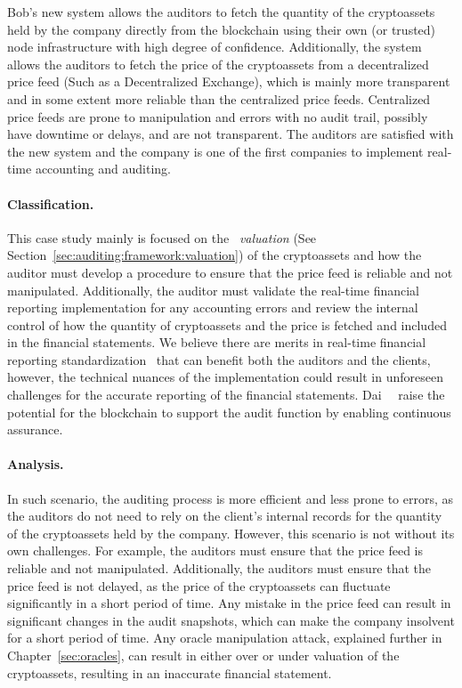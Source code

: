 Bob's new system allows the auditors to fetch the quantity of the cryptoassets held by the company directly from the blockchain using their own (or trusted) node infrastructure with high degree of confidence. Additionally, the system allows the auditors to fetch the price of the cryptoassets from a decentralized price feed (Such as a Decentralized Exchange), which is mainly more transparent and in some extent more reliable than the centralized price feeds. Centralized price feeds are prone to manipulation and errors with no audit trail, possibly have downtime or delays, and are not transparent. The auditors are satisfied with the new system and the company is one of the first companies to implement real-time accounting and auditing. 

\paragraph{Classification.} This case study mainly is focused on the ~\textit{valuation} (See Section~\ref{sec:auditing:framework:valuation}) of the cryptoassets and how the auditor must develop a procedure to ensure that the price feed is reliable and not manipulated. Additionally, the auditor must validate the real-time financial reporting implementation for any accounting errors and review the internal control of how the quantity of cryptoassets and the price is fetched and included in the financial statements. We believe there are merits in real-time financial reporting standardization~\cite{bakarich2020use,yu2018blockchain} that can benefit both the auditors and the clients, however, the technical nuances of the implementation could result in unforeseen challenges for the accurate reporting of the financial statements. Dai~\etal~\cite{dai2017toward} raise the potential for the blockchain to support the audit function by enabling continuous assurance. 


\paragraph{Analysis.} In such scenario, the auditing process is more efficient and less prone to errors, as the auditors do not need to rely on the client's internal records for the quantity of the cryptoassets held by the company. However, this scenario is not without its own challenges. For example, the auditors must ensure that the price feed is reliable and not manipulated. Additionally, the auditors must ensure that the price feed is not delayed, as the price of the cryptoassets can fluctuate significantly in a short period of time. Any mistake in the price feed can result in significant changes in the audit snapshots, which can make the company insolvent for a short period of time. Any oracle manipulation attack, explained further in Chapter~\ref{sec:oracles}, can result in either over or under valuation of the cryptoassets, resulting in an inaccurate financial statement.




